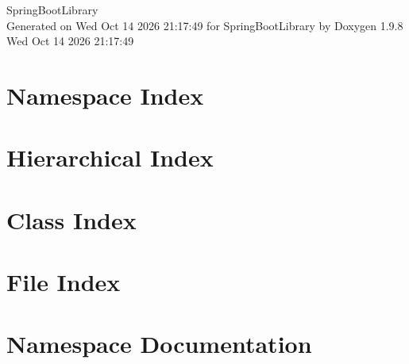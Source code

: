 \documentclass[twoside]{book}
\newcommand{\+}{\discretionary{\mbox{\scriptsize$\hookleftarrow$}}{}{}}
\newcommand{\clearemptydoublepage}{%
    \newpage{\pagestyle{empty}\cleardoublepage}%
  }
\begin{document}
  \raggedbottom
    \hypersetup{pageanchor=false,
                bookmarksnumbered=true,
                pdfencoding=unicode
               }
  \begin{titlepage}
  \vspace*{7cm}
  \begin{center}%
  {\Large Spring\+Boot\+Library}\\
  \vspace*{1cm}
  {\large Generated on Wed Oct 14 2026 21\+:17\+:49 for Spring\+Boot\+Library by Doxygen 1.9.8}\\
    \vspace*{0.5cm}
    {\small Wed Oct 14 2026 21:17:49}
  \end{center}
  \end{titlepage}
  \clearemptydoublepage
  \tableofcontents
  \clearemptydoublepage
  \hypersetup{pageanchor=true}
\chapter{Namespace Index}

\chapter{Hierarchical Index}

\chapter{Class Index}

\chapter{File Index}

\chapter{Namespace Documentation}








\end{document}
